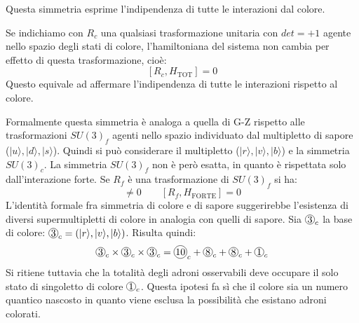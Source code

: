 Questa simmetria esprime l'indipendenza di tutte le interazioni dal colore.

 Se indichiamo con $R_c$ una qualsiasi trasformazione 
unitaria con $det=+1$ agente nello
spazio degli stati di colore, l'hamiltoniana del sistema non cambia per effetto 
di questa trasformazione, cioè:
\[
[R_c,H_{\text{TOT}}]=0
\]
Questo equivale ad affermare l'indipendenza di tutte le interazioni rispetto al 
colore.

Formalmente questa simmetria è analoga a quella di G-Z rispetto alle 
trasformazioni $SU(3)_f$ agenti nello
spazio individuato dal multipletto di sapore ($|u\rangle,|d\rangle,|s\rangle$).
Quindi si può considerare il multipletto ($|r\rangle,|v\rangle,|b\rangle$) e 
la simmetria $SU(3)_c$. La
simmetria $SU(3)_f$ non è però esatta, in quanto è rispettata solo 
dall'interazione forte. Se $R_f$ è una
trasformazione di $SU(3)_f$ si ha:
\begin{equation}
[R_f,H_{\text{TOT}}]\neq 0\qquad[R_f,H_{\text{FORTE}}]=0
\end{equation}
L'identità formale fra simmetria di colore e di sapore suggerirebbe 
l'esistenza di diversi supermultipletti
di colore in analogia con quelli di sapore. Sia $\Ci{3}_c$ la base di colore:
$\Ci{3}_c=(|r\rangle,|v\rangle,|b\rangle)$. Risulta quindi:
\begin{equation}
\Ci{3}_c\times\Ci{3}_c\times\Ci{3}_c=\Ci{10}_c+\Ci{8}_c+\Ci{8}_c+\Ci{1}_c
\end{equation}
Si ritiene tuttavia che la totalità degli adroni osservabili deve occupare il 
solo stato di singoletto di colore $\Ci{1}_c$.
Questa ipotesi fa sì che il colore sia un numero quantico nascosto in quanto 
viene esclusa la possibilità che
esistano adroni colorati.

